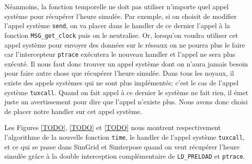 Néanmoins, la fonction temporelle ne doit pas utiliser n'importe quel appel système pour récupérer l'heure simulée. Par exemple, si on choisit de modifier l'appel système \texttt{send}, on va placer dans le handler de ce dernier l'appel à la fonction \texttt{MSG\_get\_clock} puis on le neutralise. Or, lorsqu'on voudra utiliser cet appel système pour envoyer des données sur le réseaux on ne pourra plus le faire car l'intercepteur \texttt{ptrace} exécutera le nouveau handler et l'appel ne sera plus exécuté. Il nous faut donc trouver un appel système dont on n'aura jamais besoin pour faire autre chose que récupérer l'heure simulée. Dans tous les noyaux, il existe des appels systèmes qui ne sont plus implémentés; c'est le cas de l'appel système \texttt{tuxcall}. Quand on fait appel à ce dernier le système ne fait rien, il émet juste un avertissement pour dire que l'appel n'existe plus. Nous avons donc choisi de placer notre handler sur cet appel système.

Les Figures \ref{TODO}, \ref{TODO} et \ref{TODO} nous montrent respectivement l'algorithme de la nouvelle fonction \texttt{time}, le handler de l'appel système \texttt{tuxcall}, et ce qui se passe dans SimGrid et Simterpose quand on veut récupérer l'heure simulée grâce à la double interception complémentaire de \texttt{LD\_PRELOAD} et \texttt{ptrace}.


